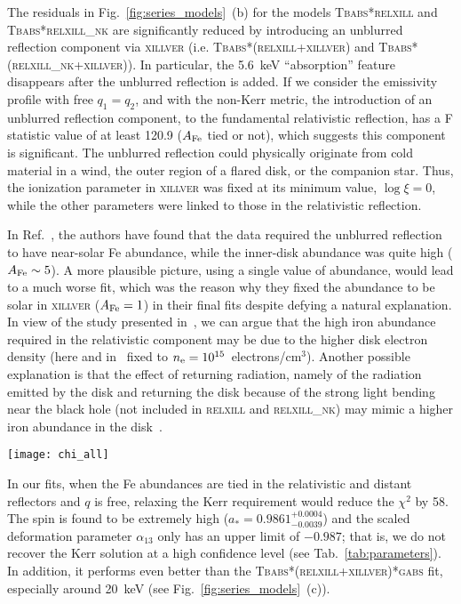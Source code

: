 \documentclass[11pt,a4paper,pdftex]{article}
\begin{document}
The residuals in Fig.~\ref{fig:series_models}~(b) for the models \textsc{Tbabs*relxill} and \textsc{Tbabs*relxill\_nk} are significantly reduced by introducing an unblurred reflection component via \textsc{xillver} (i.e. \textsc{Tbabs*(relxill+xillver)} and \textsc{Tbabs*(relxill\_nk+xillver)}). In particular, the 5.6~keV ``absorption'' feature disappears after the unblurred reflection is added. If we consider the emissivity profile with free $q_1=q_2$, and with the non-Kerr metric, the introduction of an unblurred reflection component, to the fundamental relativistic reflection, has a F statistic value of at least 120.9 ($A_{\rm Fe}$ tied or not), which suggests this component is significant. The unblurred reflection could physically originate from cold material in a wind, the outer region of a flared disk, or the companion star. Thus, the ionization parameter in \textsc{xillver} was fixed at its minimum value, $\log\xi= 0$, while the other parameters were linked to those in the relativistic reflection. 


In Ref.~\cite{javier_gx339}, the authors have found that the data required the unblurred reflection to have near-solar Fe abundance, while the inner-disk abundance was quite high ($A_{\rm Fe}\sim5$). A more plausible picture, using a single value of abundance, would lead to a much worse fit, which was the reason why they fixed the abundance to be solar in \textsc{xillver} ($A_{\rm Fe}=1$) in their final fits despite defying a natural explanation. In view of the study presented in~\cite{Jiang:2019xqn}, we can argue that the high iron abundance required in the relativistic component may be due to the higher disk electron density (here and in~\cite{javier_gx339} fixed to $n_{\rm e} = 10^{15}$~electrons/cm$^3$). Another possible explanation is that the effect of returning radiation, namely of the radiation emitted by the disk and returning the disk because of the strong light bending near the black hole (not included in \textsc{relxill} and \textsc{relxill\_nk}) may mimic a higher iron abundance in the disk~\cite{Ross:2002ix}.


\begin{figure*}[t]
\texttt{[image: chi\_all]}
\caption{Contributions to $\chi^2$ for the spectrum resulting from fitting. See the context for more details. \label{fig:series_models}}
\end{figure*}


In our fits, when the Fe abundances are tied in the relativistic and distant reflectors and $q$ is free, relaxing the Kerr requirement would reduce the $\chi^2$ by 58. The spin is found to be extremely high ($a_*=0.9861^{+0.0004}_{-0.0039}$) and the scaled deformation parameter $\alpha_{13}$ only has an upper limit of $-0.987$; that is, we do not recover the Kerr solution at a high confidence level (see Tab.~\ref{tab:parameters}). In addition, it performs even better than the \textsc{Tbabs*(relxill+xillver)*gabs} fit, especially around 20~keV (see Fig.~\ref{fig:series_models}~(c)). 
\end{document}
